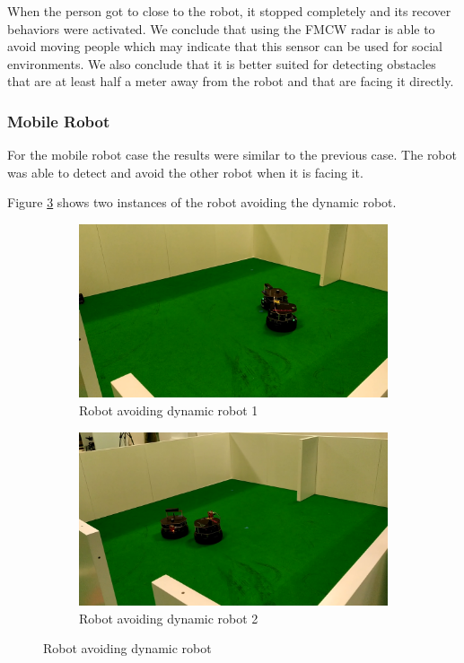 When the person got to close to the robot, it stopped completely and its recover behaviors were activated. We conclude that using  the \ac{FMCW} \ac{radar} is able to avoid moving people which may indicate that this sensor can be used for social environments. We also conclude that it is better suited for detecting obstacles that are at least half a meter away from the robot and that are facing it directly. 
\subsubsection{Mobile Robot}
For the mobile robot case the results were similar to the previous case. The robot was able to detect and avoid the other robot when it is facing it.

Figure \ref{fig:exp3robot} shows two instances of the robot avoiding the dynamic robot.
\begin{figure}[ht!]
  \centering
  \begin{subfigure}[b]{0.49\linewidth}
    \includegraphics[width=\linewidth]{imgs/chapter5/exp3robot1.png}
     \caption{Robot avoiding dynamic robot 1}
     \label{fig::exp3robot1}
  \end{subfigure}
  \begin{subfigure}[b]{0.49\linewidth}
    \includegraphics[width=\linewidth]{imgs/chapter5/exp3robot2.png}
    \caption{Robot avoiding dynamic robot 2}
    \label{fig::exp3robot2}
  \end{subfigure}
  \caption{Robot avoiding dynamic robot }
  \label{fig:exp3robot}
\end{figure}

